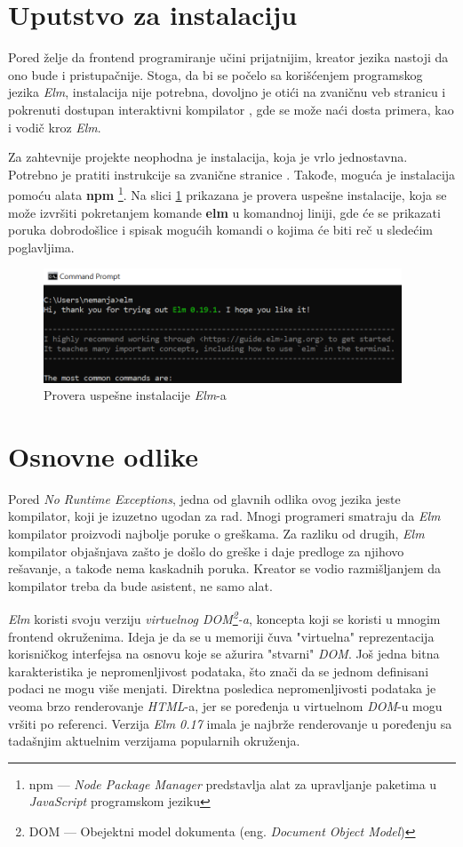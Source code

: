 \documentclass[12pt,oneside]{memoir}
\begin{document}
\section{Uputstvo za instalaciju}
Pored želje da frontend programiranje učini prijatnijim, kreator jezika nastoji 
da ono bude i pristupačnije. Stoga, da bi se počelo sa korišćenjem programskog jezika \emph{Elm}, instalacija
nije potrebna, dovoljno je otići na zvaničnu veb stranicu i pokrenuti dostupan 
interaktivni kompilator \cite{tryelm}, gde se može naći dosta primera, kao i vodič kroz \emph{Elm}.

Za zahtevnije projekte neophodna je instalacija, koja je vrlo
jednostavna. Potrebno je pratiti instrukcije sa zvanične stranice
\cite{installelm}. Takođe, moguća je instalacija pomoću alata \textbf{npm} \cite{npm}
\footnote{npm --- \emph{Node Package Manager} predstavlja alat za upravljanje paketima u 
\emph{JavaScript} programskom jeziku}.
Na slici \ref{fig:elm-cmd} prikazana je provera uspešne instalacije, koja se može izvršiti
pokretanjem komande \textbf{elm} u komandnoj liniji, gde će se prikazati poruka
dobrodošlice i spisak mogućih komandi o kojima će biti reč u sledećim poglavljima.
\begin{figure}[!ht]
  \centering
  \includegraphics[width=0.95\textwidth]{elm-cmd.png}
  \caption{Provera uspešne instalacije \emph{Elm}-a}
  \label{fig:elm-cmd}
\end{figure}

\section{Osnovne odlike}
Pored \emph{No Runtime Exceptions}, jedna od glavnih odlika ovog jezika jeste
kompilator, koji je izuzetno ugodan za rad. Mnogi programeri smatraju da \emph{Elm}
kompilator proizvodi najbolje poruke o greškama. Za razliku od drugih, \emph{Elm}
kompilator objašnjava zašto je došlo do greške i daje predloge za njihovo rešavanje,
a takođe nema kaskadnih poruka. Kreator se vodio razmišljanjem da kompilator treba
da bude asistent, ne samo alat.

\emph{Elm} koristi svoju verziju \emph{virtuelnog DOM\footnote{DOM --- Obejektni model
dokumenta (eng. \emph{Document Object Model})\cite{dom}}-a}, koncepta koji se koristi u mnogim
frontend okruženima. Ideja je da se u memoriji čuva "virtuelna" reprezentacija
korisničkog interfejsa na osnovu koje se ažurira "stvarni" \emph{DOM}. Još jedna bitna
karakteristika je nepromenljivost podataka, što znači da se jednom definisani
podaci ne mogu više menjati. Direktna posledica nepromenljivosti podataka je veoma
brzo renderovanje \emph{HTML}-a, jer se poređenja u virtuelnom \emph{DOM}-u mogu vršiti po referenci. 
Verzija \emph{Elm 0.17} imala je najbrže renderovanje u poređenju sa tadašnjim aktuelnim verzijama 
popularnih okruženja\cite{elm-html}.
\end{document}
